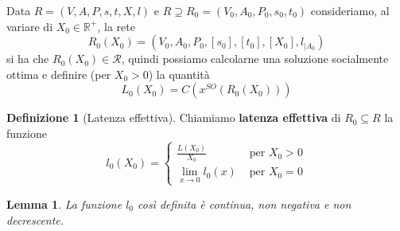 \documentclass[a4paper]{article}
\theoremstyle{plain}
\newtheorem{mylem}[myteo]{Lemma}
\theoremstyle{definition}
\newtheorem{mydef}[myteo]{Definizione}
\theoremstyle{remark}
\newcommand{\pa}[1]{\left(#1\right)}
\newcommand{\bra}[1]{\left[#1\right]}
\begin{document}
Data $R=(V,A,P,s,t,X,l)$ e $R\supseteq R_0 =(V_0,A_0,P_0,s_0,t_0)$
consideriamo, al variare di $X_0\in \mathbb{R}^+$, la rete
\[ R_0\pa{X_0} = \pa{V_0,A_0,P_0,\bra{s_0},\bra{t_0},\bra{X_0},
    l_{\mid A_0}} \]
si ha che $R_0\pa{X_0}\in \mathcal{R}$, quindi possiamo calcolarne una
soluzione socialmente ottima e definire (per $X_0>0$) la quantità
\[ L_0\pa{X_0} = C\pa{x^{SO}\pa{R_0\pa{X_0}}} \]
\begin{mydef}[Latenza effettiva]
  Chiamiamo \textbf{latenza effettiva} di $R_0 \subseteq R$ la
  funzione
  \[ l_0\pa{X_0} = \left\{
      \begin{matrix}
        \frac{L\pa{X_0}}{X_0} & \text{ per } X_0 > 0 \\
        \lim _{x\to 0} l_0\pa{x} & \text{ per } X_0 = 0
      \end{matrix}
    \right. \]
\end{mydef}
\begin{mylem}
\label{lem:l0-regolare}
  La funzione $l_0$ così definita è continua, non negativa e non
  decrescente.
\end{mylem}
\end{document}
